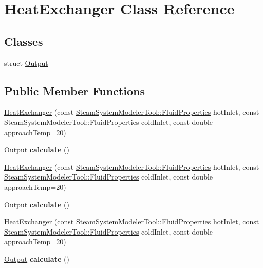 \hypertarget{class_heat_exchanger}{}\section{Heat\+Exchanger Class Reference}
\label{class_heat_exchanger}
\subsection*{Classes}
\begin{DoxyCompactItemize}
\item 
struct \hyperlink{struct_heat_exchanger_1_1_output}{Output}
\end{DoxyCompactItemize}
\subsection*{Public Member Functions}
\begin{DoxyCompactItemize}
\item 
\hyperlink{class_heat_exchanger_adc897b215af3e2759c78edb2ef0b6bf9}{Heat\+Exchanger} (const \hyperlink{struct_steam_system_modeler_tool_1_1_fluid_properties}{Steam\+System\+Modeler\+Tool\+::\+Fluid\+Properties} hot\+Inlet, const \hyperlink{struct_steam_system_modeler_tool_1_1_fluid_properties}{Steam\+System\+Modeler\+Tool\+::\+Fluid\+Properties} cold\+Inlet, const double approach\+Temp=20)
\item 
\mbox{\label{class_heat_exchanger_a9322c6d0f9a33866e35157203eaf0ec6}} 
\hyperlink{struct_heat_exchanger_1_1_output}{Output} {\bfseries calculate} ()
\item 
\hyperlink{class_heat_exchanger_adc897b215af3e2759c78edb2ef0b6bf9}{Heat\+Exchanger} (const \hyperlink{struct_steam_system_modeler_tool_1_1_fluid_properties}{Steam\+System\+Modeler\+Tool\+::\+Fluid\+Properties} hot\+Inlet, const \hyperlink{struct_steam_system_modeler_tool_1_1_fluid_properties}{Steam\+System\+Modeler\+Tool\+::\+Fluid\+Properties} cold\+Inlet, const double approach\+Temp=20)
\item 
\mbox{\label{class_heat_exchanger_a9322c6d0f9a33866e35157203eaf0ec6}} 
\hyperlink{struct_heat_exchanger_1_1_output}{Output} {\bfseries calculate} ()
\item 
\hyperlink{class_heat_exchanger_adc897b215af3e2759c78edb2ef0b6bf9}{Heat\+Exchanger} (const \hyperlink{struct_steam_system_modeler_tool_1_1_fluid_properties}{Steam\+System\+Modeler\+Tool\+::\+Fluid\+Properties} hot\+Inlet, const \hyperlink{struct_steam_system_modeler_tool_1_1_fluid_properties}{Steam\+System\+Modeler\+Tool\+::\+Fluid\+Properties} cold\+Inlet, const double approach\+Temp=20)
\item 
\mbox{\label{class_heat_exchanger_a9322c6d0f9a33866e35157203eaf0ec6}} 
\hyperlink{struct_heat_exchanger_1_1_output}{Output} {\bfseries calculate} ()
\end{DoxyCompactItemize}



